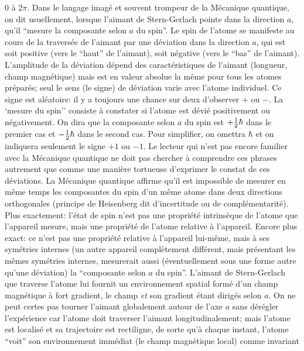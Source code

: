 $0$ \`a $2\pi$.  
\medskip 
Dans le langage imag\'e et souvent trompeur de la M\'ecanique quantique, 
on dit usuellement, 
lorsque l'aimant de Stern-Gerlach pointe dans la direction $a$, qu'il 
``mesure la composante selon $a$ du spin''. Le spin de l'atome se 
manifeste au cours de la travers\'ee de l'aimant par une d\'eviation dans  
la direction $a$, qui est soit positive (vers le ``haut'' de l'aimant), soit 
n\'egative (vers le ``bas'' de l'aimant). L'amplitude de la d\'eviation  
d\'epend des caract\'eristiques de l'aimant (longueur, champ magn\'etique) 
mais est en valeur absolue la m\^eme pour tous les atomes pr\'epar\'es; 
seul le sens (le signe) de d\'eviation varie avec l'atome individuel. 
Ce signe est al\'eatoire: il y a toujours une chance sur deux d'observer  
$+$ ou $-$.  La `mesure du spin'' consiste \`a constater si 
l'atome est d\'evi\'e positivement ou  n\'egativement. On dira que la 
composante selon $a$ du spin est $+{1  \over 2}\hbar$ dans le premier  
cas et $-{1 \over 2}\hbar$ dans le second cas. Pour simplifier, on  
omettra $\hbar$ et on indiquera seulement le signe $+1$ ou $-1$.  
Le lecteur qui n'est pas encore familier avec la M\'ecanique quantique 
ne doit pas chercher \`a comprendre ces phrases autrement que comme  
une mani\`ere tortueuse d'exprimer le constat de ces d\'eviations.  
\medskip 
La M\'ecanique quantique affirme qu'il est impossible de mesurer en 
m\^eme temps les composantes du spin d'un m\^eme atome dans deux 
directions orthogonales (principe de Heisenberg dit d'incertitude ou de 
compl\'ementarit\'e). Plus exactement:  l'\'etat de spin n'est pas une 
propri\'et\'e intrins\`eque de l'atome que  l'appareil mesure, mais une 
propri\'et\'e de  l'atome relative \`a l'appareil. Encore plus exact: ce
n'est pas une propri\'et\'e relative \`a l'appareil lui-m\^eme, mais \`a ses 
sym\'etries internes (un autre appareil compl\`etement diff\'erent, mais 
pr\'esentant les m\^emes sym\'etries internes, mesurerait aussi 
(\'eventuellement sous une forme autre qu'une d\'eviation) la ``composante 
selon $a$ du spin''. L'aimant de Stern-Gerlach que traverse l'atome lui 
fournit un environnement spatial form\'e d'un champ magn\'etique \`a fort 
gradient, le champ {\it et} son gradient \'etant dirig\'es selon $a$. On ne 
peut certes pas tourner l'aimant globalement autour de l'axe $a$ sans 
d\'er\'egler l'exp\'erience car l'atome doit traverser l'aimant 
longitudinalement; mais l'atome est localis\'e et sa trajectoire est 
rectiligne, de sorte qu'\`a  chaque instant, l'atome ``voit'' son 
environnement imm\'ediat (le champ magn\'etique local) comme invariant 
